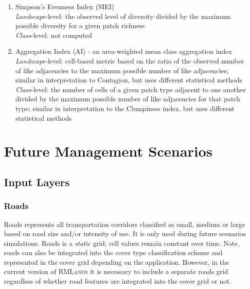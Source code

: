 \begin{itemize}
\begin{enumerate}
		\item Simpson's Evenness Index (SIEI) \\
		\emph{Landscape}-level:  the observed level of diversity divided by the maximum possible diversity for a given patch richness 	\\
		\emph{Class}-level: not computed\\
		
		\item Aggregation Index (AI) - an area-weighted mean class aggregation index \\
		\emph{Landscape}-level: cell-based metric based on the ratio of the observed number of like adjacencies to the maximum possible number of like adjacencies; similar in interpretation to Contagion, but uses different statistical methods
		\emph{Class}-level: the number of cells of a given patch type adjacent to one another divided by the maximum possible number of like adjacencies for that patch type; similar in interpretation to the Clumpiness index, but uses different statistical methods	\\
	\end{enumerate}

\end{itemize}

\section{Future Management Scenarios}

\subsection{Input Layers}

\subsubsection{Roads} 
Roads represents all transportation corridors classified as small, medium or large based on road size and/or intensity of use. It is only used during future scenarios simulations. Roads is a \emph{static} grid; cell values remain constant over time. Note, roads can also be integrated into the cover type classification scheme and represented in the cover grid depending on the application. However, in the current version of \textsc{RMLands} it is necessary to include a separate roads grid regardless of whether road features are integrated into the cover grid or not.

